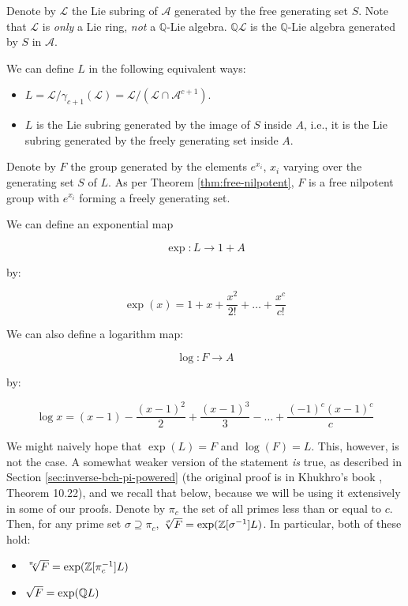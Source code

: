 Denote by $\mathcal{L}$ the Lie subring of $\mathcal{A}$ generated by
the free generating set $S$. Note that $\mathcal{L}$ is {\em only} a
Lie ring, {\em not} a $\mathbb{Q}$-Lie
algebra. $\mathbb{Q}\mathcal{L}$ is the $\mathbb{Q}$-Lie algebra
generated by $S$ in $\mathcal{A}$.

We can define $L$ in the following equivalent ways:

\begin{itemize}
\item $L = \mathcal{L}/\gamma_{c+1}(\mathcal{L}) =
  \mathcal{L}/(\mathcal{L} \cap \mathcal{A}^{c+1})$.
\item $L$ is the Lie subring generated by the image of $S$ inside $A$,
  i.e., it is the Lie subring generated by the freely generating set
  inside $A$.
\end{itemize}

Denote by $F$ the group generated by the elements $e^{x_i}$, $x_i$
varying over the generating set $S$ of $L$. As per Theorem
\ref{thm:free-nilpotent}, $F$ is a free nilpotent group with $e^{x_i}$
forming a freely generating set.

We can define an exponential map

$$\exp:L \to 1 + A$$

by:

$$\exp(x) = 1 + x + \frac{x^2}{2!} + \dots + \frac{x^c}{c!}$$

We can also define a logarithm map:

$$\log:F \to A$$

by:

$$\log x = (x - 1) - \frac{(x - 1)^2}{2} + \frac{(x - 1)^3}{3} - \dots + \frac{(-1)^c(x - 1)^c}{c}$$

We might naively hope that $\exp(L) = F$ and $\log(F) = L$. This,
however, is not the case. A somewhat weaker version of the statement
{\em is} true, as described in Section
\ref{sec:inverse-bch-pi-powered} (the original proof is in Khukhro's
book \cite{Khukhro}, Theorem 10.22), and we recall that below, because
we will be using it extensively in some of our proofs. Denote by
$\pi_c$ the set of all primes less than or equal to $c$. Then, for any
prime set $\sigma \supseteq \pi_c$, $\sqrt[\sigma]{F} =
\exp(\mathbb{Z}[\sigma^{-1}]L)$. In particular, both of these hold:

\begin{itemize}
\item $\sqrt[\pi_c]{F} = \exp(\mathbb{Z}[\pi_c^{-1}]L)$
\item $\sqrt{F} = \exp(\mathbb{Q} L)$ 
\end{itemize}

